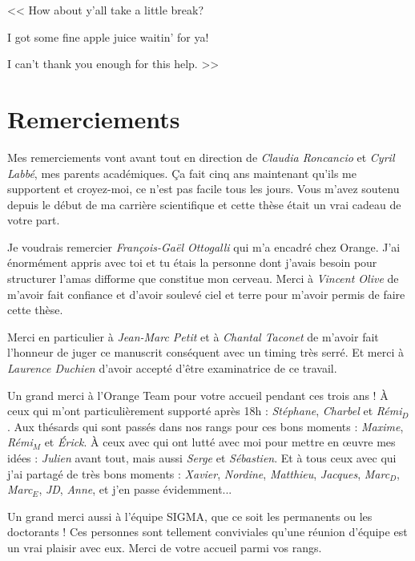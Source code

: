 \MakeUGthesePDG

\begin{savequote}[7cm]
<< How about y'all take a little break? 

\quad I got some fine apple juice waitin' for ya!

\quad I can't thank you enough for this help. >>
\end{savequote}
\chapter*{Remerciements}
Mes remerciements vont avant tout en direction de \textit{Claudia Roncancio} et \textit{Cyril Labbé}, mes parents académiques. Ça fait cinq ans maintenant qu'ils me supportent et croyez-moi, ce n’est pas facile tous les jours. Vous m'avez soutenu depuis le début de ma carrière scientifique et cette thèse était un vrai cadeau de votre part.

Je voudrais remercier \textit{François-Gaël Ottogalli} qui m'a encadré chez Orange. J'ai énormément appris avec toi et tu étais la personne dont j'avais besoin pour structurer l'amas difforme que constitue mon cerveau. Merci à \textit{Vincent Olive} de m'avoir fait confiance et d'avoir soulevé ciel et terre pour m'avoir permis de faire cette thèse.

Merci en particulier à \textit{Jean-Marc Petit} et à \textit{Chantal Taconet} de m'avoir fait l'honneur de juger ce manuscrit conséquent avec un timing très serré. Et merci à \textit{Laurence Duchien} d'avoir accepté d'être examinatrice de ce travail.

Un grand merci à l'Orange Team pour votre accueil pendant ces trois ans ! À ceux qui m'ont particulièrement supporté après 18h : \textit{Stéphane}, \textit{Charbel} et \textit{Rémi}$_D$. Aux thésards qui sont passés dans nos rangs pour ces bons moments : \textit{Maxime}, \textit{Rémi}$_M$ et \textit{Érick}. À ceux avec qui ont lutté avec moi pour mettre en œuvre mes idées : \textit{Julien} avant tout, mais aussi \textit{Serge} et \textit{Sébastien}. Et à tous ceux avec qui j'ai partagé de très bons moments : \textit{Xavier}, \textit{Nordine}, \textit{Matthieu}, \textit{Jacques}, \textit{Marc}$_D$, \textit{Marc}$_E$, \textit{JD}, \textit{Anne}, et j'en passe évidemment...

Un grand merci aussi à l'équipe SIGMA, que ce soit les permanents ou les doctorants ! Ces personnes sont tellement conviviales qu'une réunion d'équipe est un vrai plaisir avec eux. Merci de votre accueil parmi vos rangs.

